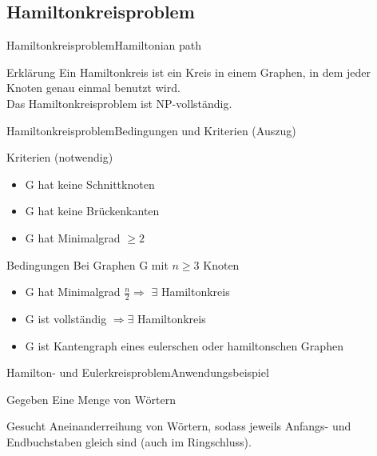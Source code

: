 \subsection{Hamiltonkreisproblem}

\begin{frame}{Hamiltonkreisproblem}{Hamiltonian path}
	\begin{block}{Erklärung}
		Ein Hamiltonkreis ist ein Kreis in einem Graphen, in dem jeder Knoten genau einmal benutzt wird.\\
		
		Das Hamiltonkreisproblem ist NP-vollständig.
	\end{block}
\end{frame}

\begin{frame}{Hamiltonkreisproblem}{Bedingungen und Kriterien (Auszug)}
	\begin{block}{Kriterien (notwendig)}
		\begin{itemize}
			\item G hat keine Schnittknoten
			\item G hat keine Brückenkanten
			\item G hat Minimalgrad $\geq 2$
		\end{itemize}
	\end{block}
	\begin{block}{Bedingungen}
		Bei Graphen G mit $n \geq 3$ Knoten		
		\begin{itemize}
			\item G hat Minimalgrad $\frac{n}{2} \Rightarrow$ $\exists $ Hamiltonkreis
			\item G ist vollständig $\Rightarrow \exists$ Hamiltonkreis
			\item G ist Kantengraph eines eulerschen oder hamiltonschen Graphen
		\end{itemize}
	\end{block}
\end{frame}

\begin{frame}{Hamilton- und Eulerkreisproblem}{Anwendungsbeispiel}
	\begin{block}{Gegeben}
		Eine Menge von Wörtern
	\end{block}
	\begin{block}{Gesucht}
		Aneinanderreihung von Wörtern, sodass jeweils Anfangs- und Endbuchstaben gleich sind 
		(auch im Ringschluss).
	\end{block}
\end{frame}


